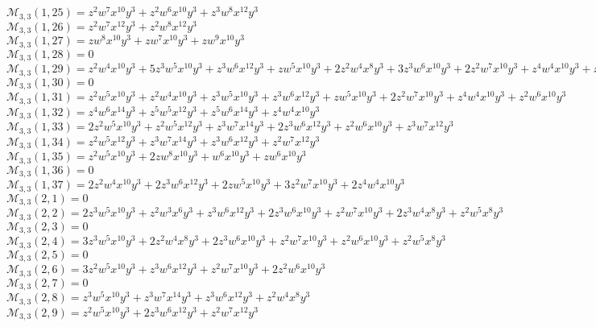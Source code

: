 $\mathcal{M}_{3,3}(1,25)=z^2w^7x^{10}y^3+z^2w^6x^{10}y^3+z^3w^8x^{12}y^3$\\
$\mathcal{M}_{3,3}(1,26)=z^2w^7x^{12}y^3+z^2w^8x^{12}y^3$\\
$\mathcal{M}_{3,3}(1,27)=zw^8x^{10}y^3+zw^7x^{10}y^3+zw^9x^{10}y^3$\\
$\mathcal{M}_{3,3}(1,28)=0$\\
$\mathcal{M}_{3,3}(1,29)=z^2w^4x^{10}y^3+5z^3w^5x^{10}y^3+z^3w^6x^{12}y^3+zw^5x^{10}y^3+2z^2w^4x^8y^3+3z^3w^6x^{10}y^3+2z^2w^7x^{10}y^3+z^4w^4x^{10}y^3+z^2w^5x^8y^3$\\
$\mathcal{M}_{3,3}(1,30)=0$\\
$\mathcal{M}_{3,3}(1,31)=z^2w^5x^{10}y^3+z^2w^4x^{10}y^3+z^3w^5x^{10}y^3+z^3w^6x^{12}y^3+zw^5x^{10}y^3+2z^2w^7x^{10}y^3+z^4w^4x^{10}y^3+z^2w^6x^{10}y^3$\\
$\mathcal{M}_{3,3}(1,32)=z^4w^6x^{14}y^3+z^5w^5x^{12}y^3+z^5w^6x^{14}y^3+z^4w^4x^{10}y^3$\\
$\mathcal{M}_{3,3}(1,33)=2z^2w^5x^{10}y^3+z^2w^5x^{12}y^3+z^3w^7x^{14}y^3+2z^3w^6x^{12}y^3+z^2w^6x^{10}y^3+z^3w^7x^{12}y^3$\\
$\mathcal{M}_{3,3}(1,34)=z^2w^5x^{12}y^3+z^3w^7x^{14}y^3+z^3w^6x^{12}y^3+z^2w^7x^{12}y^3$\\
$\mathcal{M}_{3,3}(1,35)=z^2w^5x^{10}y^3+2zw^8x^{10}y^3+w^6x^{10}y^3+zw^6x^{10}y^3$\\
$\mathcal{M}_{3,3}(1,36)=0$\\
$\mathcal{M}_{3,3}(1,37)=2z^2w^4x^{10}y^3+2z^3w^6x^{12}y^3+2zw^5x^{10}y^3+3z^2w^7x^{10}y^3+2z^4w^4x^{10}y^3$\\
$\mathcal{M}_{3,3}(2,1)=0$\\
$\mathcal{M}_{3,3}(2,2)=2z^3w^5x^{10}y^3+z^2w^3x^6y^3+z^3w^6x^{12}y^3+2z^3w^6x^{10}y^3+z^2w^7x^{10}y^3+2z^3w^4x^8y^3+z^2w^5x^8y^3$\\
$\mathcal{M}_{3,3}(2,3)=0$\\
$\mathcal{M}_{3,3}(2,4)=3z^3w^5x^{10}y^3+2z^2w^4x^8y^3+2z^3w^6x^{10}y^3+z^2w^7x^{10}y^3+z^2w^6x^{10}y^3+z^2w^5x^8y^3$\\
$\mathcal{M}_{3,3}(2,5)=0$\\
$\mathcal{M}_{3,3}(2,6)=3z^2w^5x^{10}y^3+z^3w^6x^{12}y^3+z^2w^7x^{10}y^3+2z^2w^6x^{10}y^3$\\
$\mathcal{M}_{3,3}(2,7)=0$\\
$\mathcal{M}_{3,3}(2,8)=z^3w^5x^{10}y^3+z^3w^7x^{14}y^3+z^3w^6x^{12}y^3+z^2w^4x^8y^3$\\
$\mathcal{M}_{3,3}(2,9)=z^2w^5x^{10}y^3+2z^3w^6x^{12}y^3+z^2w^7x^{12}y^3$\\
